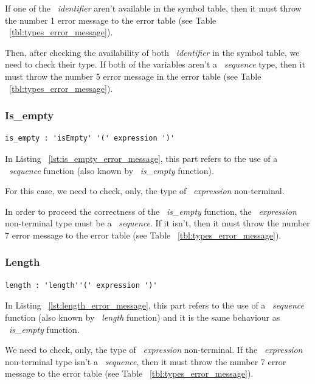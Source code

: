 \documentclass[
  oneside,
  11pt, a4paper,
  footinclude=true,
  headinclude=true,
  cleardoublepage=empty
]{scrbook}
\begin{document}
If one of the ~\textit{identifier} aren't available in the symbol table, then it must throw the number 1 error message to the error table (see Table ~\ref{tbl:types_error_message}).

Then, after checking the availability of both ~\textit{identifier} in the symbol table, we need to check their type. If both of the variables aren't a ~\textit{sequence} type, then it must throw the number 5 error message in the error table (see Table ~\ref{tbl:types_error_message}).

\subsubsection{Is\_empty}

\begin{lstlisting}[caption={Is\_empty rule in LISS}, label={lst:is_empty_error_message}]
  is_empty : 'isEmpty' '(' expression ')'
\end{lstlisting}

In Listing ~\ref{lst:is_empty_error_message}, this part refers to the use of a ~\textit{sequence} function (also known by ~\textit{is\_empty} function).

For this case, we need to check, only, the type of ~\textit{expression} non-terminal.

In order to proceed the correctness of the ~\textit{is\_empty} function, the ~\textit{expression} non-terminal type must be a ~\textit{sequence}. If it isn't, then it must throw the number 7 error message to the error table (see Table ~\ref{tbl:types_error_message}).

\subsubsection{Length}

\begin{lstlisting}[caption={Length rule in LISS},label={lst:length_error_message}]
  length : 'length''(' expression ')'
\end{lstlisting}

In Listing ~\ref{lst:length_error_message}, this part refers to the use of a ~\textit{sequence} function (also known by ~\textit{length} function) and it is the same behaviour as ~\textit{is\_empty} function.

We need to check, only, the type of ~\textit{expression} non-terminal.
If the ~\textit{expression} non-terminal type isn't a ~\textit{sequence}, then it must throw the number 7 error message to the error table (see Table ~\ref{tbl:types_error_message}).
\end{document}
